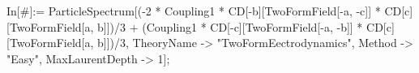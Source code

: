 In[\#]:= ParticleSpectrum[(-2 * Coupling1 * CD[-b][TwoFormField[-a, -c]] * CD[c][TwoFormField[a, b]])/3 + (Coupling1 * CD[-c][TwoFormField[-a, -b]] * CD[c][TwoFormField[a, b]])/3, TheoryName -> "TwoFormEectrodynamics", Method -> "Easy", MaxLaurentDepth -> 1]; 